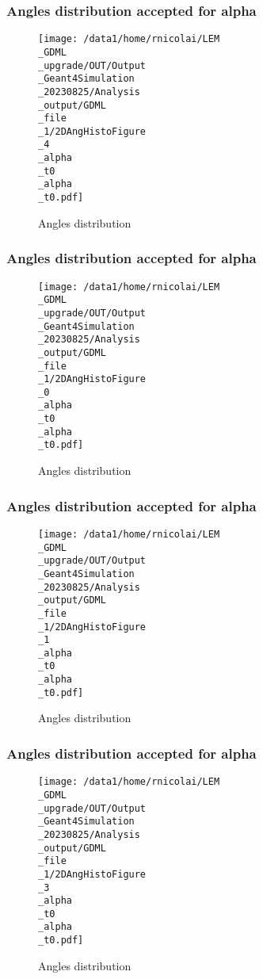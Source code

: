 \documentclass[8pt]{beamer}
\begin{document}
            \begin{frame}
                \frametitle{Angles distribution accepted for alpha}
            
        \begin{figure}[h]
            \centering
            \texttt{[image: /data1/home/rnicolai/LEM\\\_GDML\\\_upgrade/OUT/Output\\\_Geant4Simulation\\\_20230825/Analysis\\\_output/GDML\\\_file\\\_1/2DAngHistoFigure\\\_4\\\_alpha\\\_t0\\\_alpha\\\_t0.pdf]}
            \caption{Angles distribution}
        \end{figure}
        
            \end{frame}
            
            \begin{frame}
                \frametitle{Angles distribution accepted for alpha}
            
        \begin{figure}[h]
            \centering
            \texttt{[image: /data1/home/rnicolai/LEM\\\_GDML\\\_upgrade/OUT/Output\\\_Geant4Simulation\\\_20230825/Analysis\\\_output/GDML\\\_file\\\_1/2DAngHistoFigure\\\_0\\\_alpha\\\_t0\\\_alpha\\\_t0.pdf]}
            \caption{Angles distribution}
        \end{figure}
        
            \end{frame}
            
            \begin{frame}
                \frametitle{Angles distribution accepted for alpha}
            
        \begin{figure}[h]
            \centering
            \texttt{[image: /data1/home/rnicolai/LEM\\\_GDML\\\_upgrade/OUT/Output\\\_Geant4Simulation\\\_20230825/Analysis\\\_output/GDML\\\_file\\\_1/2DAngHistoFigure\\\_1\\\_alpha\\\_t0\\\_alpha\\\_t0.pdf]}
            \caption{Angles distribution}
        \end{figure}
        
            \end{frame}
            
            \begin{frame}
                \frametitle{Angles distribution accepted for alpha}
            
        \begin{figure}[h]
            \centering
            \texttt{[image: /data1/home/rnicolai/LEM\\\_GDML\\\_upgrade/OUT/Output\\\_Geant4Simulation\\\_20230825/Analysis\\\_output/GDML\\\_file\\\_1/2DAngHistoFigure\\\_3\\\_alpha\\\_t0\\\_alpha\\\_t0.pdf]}
            \caption{Angles distribution}
        \end{figure}
        
            \end{frame}
            
\end{document}
